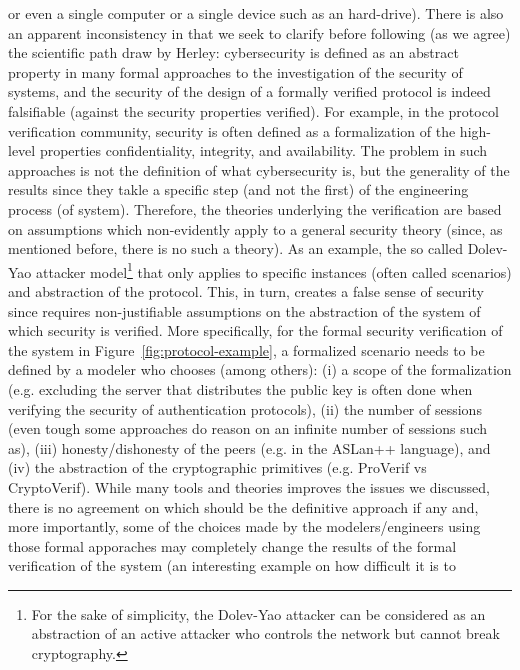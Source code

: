 or even a single computer or a single device such as an hard-drive).  There is
also an apparent inconsistency in\autocite{Herley2016unfalsifiability} that we
seek to clarify before following (as we agree) the scientific path draw by
Herley: cybersecurity is defined as an abstract property in many formal
approaches to the investigation of the security of systems, and the security of the design of a
formally verified protocol is indeed falsifiable (against the security properties verified).  For example, in the protocol
verification community, security is often defined as a formalization of the
high-level properties confidentiality, integrity, and availability. The problem
in such approaches is not the definition of what cybersecurity is, but 
the generality of the results since they takle a specific step (and not the first) of the engineering process (of system).
Therefore, the theories underlying the verification are based on 
assumptions which non-evidently apply to a general security theory (since, as mentioned before,
there is no such a theory).
As an example, the so called Dolev-Yao attacker model\footnote{For the sake of
simplicity, the Dolev-Yao attacker can be considered as an abstraction of an
active attacker who controls the network but cannot break
cryptography.}\autocite{Dolev1983security}
that only applies to specific instances (often called scenarios) and
abstraction of the protocol. This, in turn, creates a false sense of security
since requires non-justifiable assumptions on the abstraction of the system of which security
is verified. More specifically, for the formal security verification of the system
in Figure~\ref{fig:protocol-example}, a formalized scenario needs to be defined
by a modeler who chooses (among others): (i) a scope of the formalization (e.g.
excluding the server that distributes the public key is often done when
verifying the security of authentication protocols), (ii) the number of
sessions (even tough some approaches do reason on an infinite number of
sessions such as\autocite{Escobar2007maudenpa}), (iii) honesty/dishonesty of
the peers (e.g.  in the ASLan++ language\autocite{Oheimb2010aslan++}), and (iv)
the abstraction of the cryptographic primitives (e.g.  ProVerif vs
CryptoVerif\autocite{Blanchet2017symbolic}).  While many tools and theories
improves the issues we discussed, there is no agreement on which should be
the definitive approach if any and, more importantly, some of the choices made by the modelers/engineers using those formal apporaches may
completely change the results of the formal verification of the system (an interesting example on how difficult it is to 
